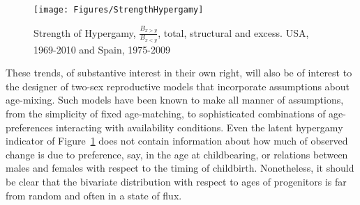 \begin{figure}[!ht]
  \centering
    \caption{Strength of Hypergamy, $\frac{B_{x>y}}{B_{x<y}}$, total, structural
    and excess. USA, 1969-2010 and Spain, 1975-2009}
    \texttt{[image: Figures/StrengthHypergamy]}      
    \label{fig:HypergamyStrength}
\end{figure}

These trends, of substantive interest in their own right, will also be of
interest to the designer of two-sex reproductive models that incorporate
 assumptions about age-mixing. Such models have been known to make all
 manner of assumptions, from the simplicity of fixed age-matching, to
 sophisticated combinations of age-preferences interacting with availability
 conditions. Even the latent hypergamy indicator of
 Figure~\ref{fig:HypergamyStrength} does not contain information about how much
 of observed change is due to preference, say, in the age at childbearing, or
 relations between males and females with respect to the timing of childbirth.
 Nonetheless, it should be clear that the bivariate distribution with respect to
 ages of progenitors is far from random and often in a state of flux.
